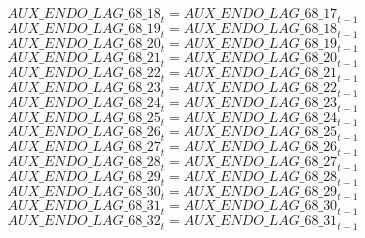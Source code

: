 \begin{dmath}
{AUX\_ENDO\_LAG\_68\_18}_{t}={AUX\_ENDO\_LAG\_68\_17}_{t-1}
\end{dmath}
\begin{dmath}
{AUX\_ENDO\_LAG\_68\_19}_{t}={AUX\_ENDO\_LAG\_68\_18}_{t-1}
\end{dmath}
\begin{dmath}
{AUX\_ENDO\_LAG\_68\_20}_{t}={AUX\_ENDO\_LAG\_68\_19}_{t-1}
\end{dmath}
\begin{dmath}
{AUX\_ENDO\_LAG\_68\_21}_{t}={AUX\_ENDO\_LAG\_68\_20}_{t-1}
\end{dmath}
\begin{dmath}
{AUX\_ENDO\_LAG\_68\_22}_{t}={AUX\_ENDO\_LAG\_68\_21}_{t-1}
\end{dmath}
\begin{dmath}
{AUX\_ENDO\_LAG\_68\_23}_{t}={AUX\_ENDO\_LAG\_68\_22}_{t-1}
\end{dmath}
\begin{dmath}
{AUX\_ENDO\_LAG\_68\_24}_{t}={AUX\_ENDO\_LAG\_68\_23}_{t-1}
\end{dmath}
\begin{dmath}
{AUX\_ENDO\_LAG\_68\_25}_{t}={AUX\_ENDO\_LAG\_68\_24}_{t-1}
\end{dmath}
\begin{dmath}
{AUX\_ENDO\_LAG\_68\_26}_{t}={AUX\_ENDO\_LAG\_68\_25}_{t-1}
\end{dmath}
\begin{dmath}
{AUX\_ENDO\_LAG\_68\_27}_{t}={AUX\_ENDO\_LAG\_68\_26}_{t-1}
\end{dmath}
\begin{dmath}
{AUX\_ENDO\_LAG\_68\_28}_{t}={AUX\_ENDO\_LAG\_68\_27}_{t-1}
\end{dmath}
\begin{dmath}
{AUX\_ENDO\_LAG\_68\_29}_{t}={AUX\_ENDO\_LAG\_68\_28}_{t-1}
\end{dmath}
\begin{dmath}
{AUX\_ENDO\_LAG\_68\_30}_{t}={AUX\_ENDO\_LAG\_68\_29}_{t-1}
\end{dmath}
\begin{dmath}
{AUX\_ENDO\_LAG\_68\_31}_{t}={AUX\_ENDO\_LAG\_68\_30}_{t-1}
\end{dmath}
\begin{dmath}
{AUX\_ENDO\_LAG\_68\_32}_{t}={AUX\_ENDO\_LAG\_68\_31}_{t-1}
\end{dmath}
